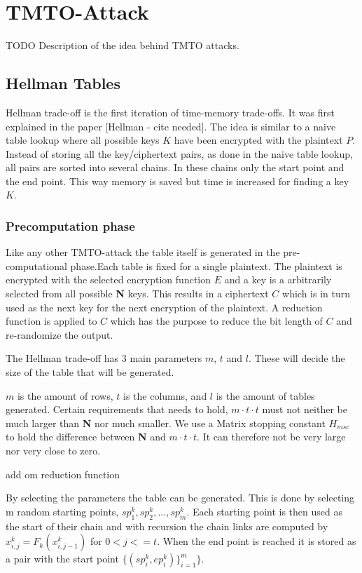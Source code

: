 \chapter{TMTO-Attack}

\label{ch:tmto}
TODO Description of the idea behind TMTO attacks.
\newpage
\section{Hellman Tables}
\label{sec:hmtheory}
Hellman trade-off is the first iteration of time-memory trade-offs. It
was first explained in the paper [Hellman - cite needed].
The idea is similar to a naive table lookup where all possible keys $K$ have been encrypted with the plaintext $P$.
Instead of storing all the key/ciphertext pairs, as done in the naive
table lookup, all pairs are sorted into several chains. In these
chains only the start point and the end point. This way memory is
saved but time is increased for finding a key $K$. 

\subsection{Precomputation phase} %
Like any other TMTO-attack the table itself is generated in the
pre-computational phase.Each table is fixed for a single
plaintext. The plaintext is encrypted with the selected encryption
function $E$ and a key is a arbitrarily selected from all possible \textbf{N}
keys. This results in a ciphertext $C$ which is in turn used as the
next key for the next encryption of the plaintext. A reduction
function is applied to $C$ which has the purpose to reduce the bit
length of $C$ and re-randomize the output.


The Hellman trade-off has 3 main parameters $m$, $t$ and $l$. These will
decide the size of the table that will be generated.

$m$ is the amount of rows, $t$ is the columns, and $l$ is the amount
of tables generated.
Certain requirements that needs to hold, $m\cdot t\cdot t$ must not
neither be much larger than \textbf{N} nor much smaller. We use a
Matrix stopping constant $H_{msc}$ to hold the difference between
\textbf{N} and $m\cdot t\cdot t$. It can therefore not be very large
nor very close to zero.


add om reduction function

By selecting the parameters the table can be generated. This is done
by selecting m random starting points,
$sp^{k}_1,sp^{k}_2,...,sp^{k}_m$. Each starting point is then used as
the start of their chain and with recursion the chain links are
computed by $ x^{k}_{i,j}=F_k( x^{k}_{i,j-1})$ for $0<j<=t$. When the
end point is reached it is stored as a pair with the start point 
$\{(sp^{k}_{i}, ep^{k}_{i})\}^{m}_{i=1}\}$.

